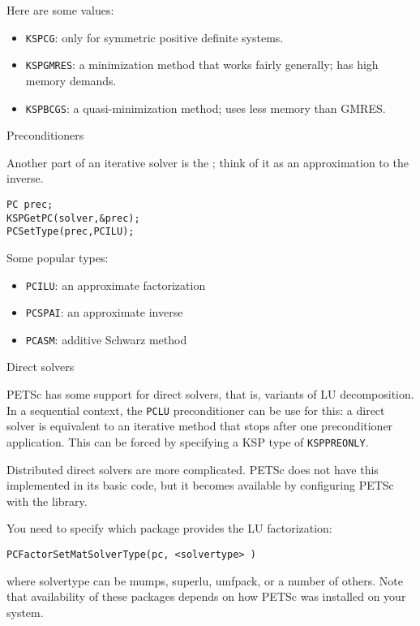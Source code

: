 Here are some values:
\begin{itemize}
\item \lstinline{KSPCG}: only for symmetric positive definite systems.
\item \lstinline{KSPGMRES}: a minimization method that works fairly
  generally; has high memory demands.
\item \lstinline{KSPBCGS}: a quasi-minimization method; uses less memory than GMRES.
\end{itemize}

 {Preconditioners}

Another part of an iterative solver is the
; think of it as an approximation to the inverse.

\begin{lstlisting}
PC prec;
KSPGetPC(solver,&prec);
PCSetType(prec,PCILU);
\end{lstlisting}

Some popular types:
\begin{itemize}
\item \lstinline{PCILU}: an approximate factorization
\item \lstinline{PCSPAI}: an approximate inverse
\item \lstinline{PCASM}: additive Schwarz method
\end{itemize}

 {Direct solvers}

PETSc has some support for direct solvers, that is, variants of LU
decomposition. In a sequential context, the \lstinline{PCLU}
preconditioner can be use for this: a direct solver is equivalent to
an iterative method that stops after one preconditioner
application. This can be forced by specifying a KSP type of
\lstinline{KSPPREONLY}.

Distributed direct solvers are more complicated. PETSc does not have
this implemented in its basic code, but it becomes available by
configuring PETSc with the
 library.

You need to specify which package provides the LU factorization:

\begin{lstlisting}
PCFactorSetMatSolverType(pc, <solvertype> )
\end{lstlisting}

where solvertype can be mumps, superlu, umfpack, or a number of
others. Note that availability of these packages depends on how PETSc
was installed on your system.

